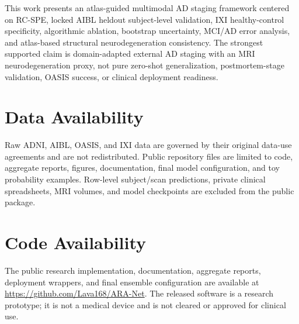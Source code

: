 This work presents an atlas-guided multimodal AD staging framework centered on RC-SPE, locked AIBL heldout subject-level validation, IXI healthy-control specificity, algorithmic ablation, bootstrap uncertainty, MCI/AD error analysis, and atlas-based structural neurodegeneration consistency. The strongest supported claim is domain-adapted external AD staging with an MRI neurodegeneration proxy, not pure zero-shot generalization, postmortem-stage validation, OASIS success, or clinical deployment readiness.



\section*{Data Availability}
Raw ADNI, AIBL, OASIS, and IXI data are governed by their original data-use agreements and are not redistributed. Public repository files are limited to code, aggregate reports, figures, documentation, final model configuration, and toy probability examples. Row-level subject/scan predictions, private clinical spreadsheets, MRI volumes, and model checkpoints are excluded from the public package.

\section*{Code Availability}
The public research implementation, documentation, aggregate reports, deployment wrappers, and final ensemble configuration are available at \url{https://github.com/Lava168/ARA-Net}. The released software is a research prototype; it is not a medical device and is not cleared or approved for clinical use.
